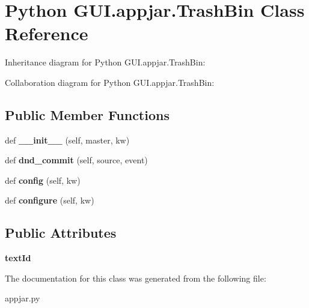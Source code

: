 \hypertarget{class_python_01_g_u_i_1_1appjar_1_1_trash_bin}{}\section{Python G\+U\+I.\+appjar.\+Trash\+Bin Class Reference}
\label{class_python_01_g_u_i_1_1appjar_1_1_trash_bin}


Inheritance diagram for Python G\+U\+I.\+appjar.\+Trash\+Bin\+:


Collaboration diagram for Python G\+U\+I.\+appjar.\+Trash\+Bin\+:
\subsection*{Public Member Functions}
\begin{DoxyCompactItemize}
\item 
\mbox{\label{class_python_01_g_u_i_1_1appjar_1_1_trash_bin_a380044f91fb5a96fbcc7210a8641c9c0}} 
def {\bfseries \+\_\+\+\_\+init\+\_\+\+\_\+} (self, master, kw)
\item 
\mbox{\label{class_python_01_g_u_i_1_1appjar_1_1_trash_bin_a9aa1a1b2f7524ebff8fba7301d0333d6}} 
def {\bfseries dnd\+\_\+commit} (self, source, event)
\item 
\mbox{\label{class_python_01_g_u_i_1_1appjar_1_1_trash_bin_a992def59706587e0185d02bef03558dc}} 
def {\bfseries config} (self, kw)
\item 
\mbox{\label{class_python_01_g_u_i_1_1appjar_1_1_trash_bin_a2a2d93707a43639fb2ba3ea0e9b84c1a}} 
def {\bfseries configure} (self, kw)
\end{DoxyCompactItemize}
\subsection*{Public Attributes}
\begin{DoxyCompactItemize}
\item 
\mbox{\label{class_python_01_g_u_i_1_1appjar_1_1_trash_bin_a71e4ec2c13f874535b6c3466d43ce594}} 
{\bfseries text\+Id}
\end{DoxyCompactItemize}


The documentation for this class was generated from the following file\+:\begin{DoxyCompactItemize}
\item 
appjar.\+py\end{DoxyCompactItemize}
